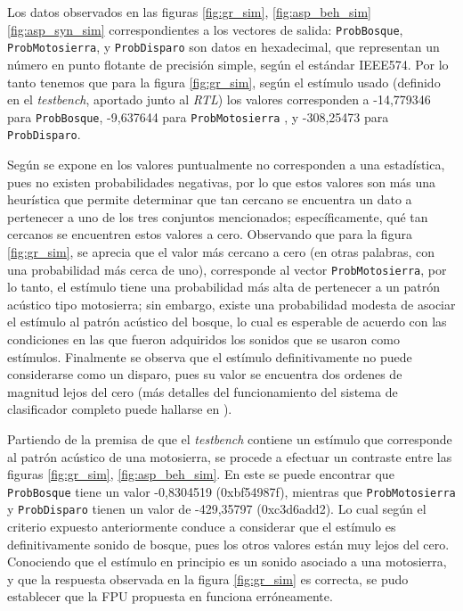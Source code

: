 Los datos observados en las figuras \ref{fig:gr_sim}, \ref{fig:asp_beh_sim} \ref{fig:asp_syn_sim} correspondientes a los vectores de salida: \texttt{ProbBosque}, \texttt{ProbMotosierra}, y \texttt{ProbDisparo} son datos en hexadecimal, que representan un número en punto flotante de precisión simple, según el estándar IEEE574. Por lo tanto tenemos que para la figura \ref{fig:gr_sim}, según el estímulo usado (definido en el \textit{testbench}, aportado junto al \textit{RTL}) los valores corresponden a -14,779346 para \texttt{ProbBosque}, -9,637644 para \texttt{ProbMotosierra} , y -308,25473 para \texttt{ProbDisparo}.

Según se expone en \cite{Carlosthesis} los valores puntualmente no corresponden a una estadística, pues no existen probabilidades negativas, por lo que estos valores son más una heurística que permite determinar que tan cercano se encuentra un dato a pertenecer a uno de los tres conjuntos mencionados; específicamente, qué tan cercanos se encuentren estos valores a cero. Observando que para la figura \ref{fig:gr_sim}, se aprecia que el valor más cercano a cero (en otras palabras, con una probabilidad más cerca de uno), corresponde al vector \texttt{ProbMotosierra}, por lo tanto, el estímulo tiene una probabilidad más alta de pertenecer a un patrón acústico tipo motosierra; sin embargo, existe una probabilidad modesta de asociar el estímulo al patrón acústico del bosque, lo cual es esperable de acuerdo con las condiciones en las que fueron adquiridos los sonidos que se usaron como estímulos. Finalmente se observa que el estímulo definitivamente no puede considerarse como un disparo, pues su valor se encuentra dos ordenes de magnitud lejos del cero (más detalles del funcionamiento del sistema de clasificador completo puede hallarse en \cite{Carlosthesis, lascas_carlos, concapan}).

Partiendo de la premisa de que el \textit{testbench} contiene un estímulo que corresponde al patrón acústico de una motosierra, se procede a efectuar un contraste entre las figuras \ref{fig:gr_sim}, \ref{fig:asp_beh_sim}. En este se puede encontrar que \texttt{ProbBosque} tiene un valor -0,8304519 (0xbf54987f), mientras que \texttt{ProbMotosierra} y \texttt{ProbDisparo} tienen un valor de -429,35797 (0xc3d6add2). Lo cual según el criterio expuesto anteriormente conduce a considerar que el estímulo es definitivamente sonido de bosque, pues los otros valores están muy lejos del cero. Conociendo que el estímulo en principio es un sonido asociado a una motosierra, y que la respuesta observada en la figura \ref{fig:gr_sim} es correcta, se pudo establecer que la FPU propuesta en \cite{Francis2016} funciona erróneamente. 

